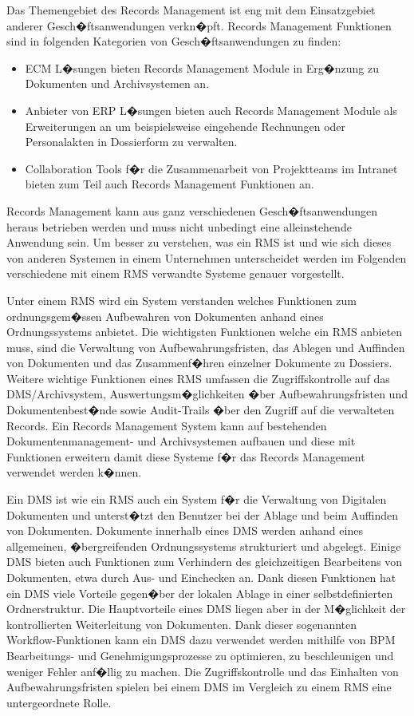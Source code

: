 \documentclass[a4paper,twoside,10pt]{report}
\begin{document}
Das Themengebiet des Records Management ist eng mit dem Einsatzgebiet anderer Gesch�ftsanwendungen verkn�pft. Records Management Funktionen sind in folgenden Kategorien von Gesch�ftsanwendungen zu finden: 

\begin{itemize}
	\item \ac{ECM} L�sungen bieten Records Management Module in Erg�nzung zu Dokumenten und Archivsystemen an. 
	\item Anbieter von \ac{ERP} L�sungen bieten auch Records Management Module als Erweiterungen an um beispielsweise eingehende Rechnungen oder Personalakten in Dossierform zu verwalten.
	\item Collaboration Tools f�r die Zusammenarbeit von Projektteams im Intranet bieten zum Teil auch Records Management Funktionen an.
\end{itemize} 
\cite{krm}

Records Management kann aus ganz verschiedenen Gesch�ftsanwendungen heraus betrieben werden und muss nicht unbedingt eine alleinstehende Anwendung sein. Um besser zu verstehen, was ein \acf{RMS} ist und wie sich dieses von anderen Systemen in einem Unternehmen unterscheidet werden im Folgenden verschiedene mit einem \ac{RMS} verwandte Systeme genauer vorgestellt. 

Unter einem \ac{RMS} wird ein System verstanden welches Funktionen zum ordnungsgem�ssen Aufbewahren von Dokumenten anhand eines Ordnungssystems anbietet. Die wichtigsten Funktionen welche ein \ac{RMS} anbieten muss, sind die Verwaltung von Aufbewahrungsfristen, das Ablegen und Auffinden von Dokumenten und das Zusammenf�hren einzelner Dokumente zu Dossiers. Weitere wichtige Funktionen eines \ac{RMS} umfassen die Zugriffskontrolle auf das DMS/Archivsystem, Auswertungsm�glichkeiten �ber Aufbewahrungsfristen und Dokumentenbest�nde sowie Audit-Trails �ber den Zugriff auf die verwalteten Records. Ein Records Management System kann auf bestehenden Dokumentenmanagement- und Archivsystemen aufbauen und diese mit Funktionen erweitern damit diese Systeme f�r das Records Management verwendet werden k�nnen. \cite{krm} 

Ein \ac{DMS} ist wie ein \ac{RMS} auch ein System f�r die Verwaltung von Digitalen Dokumenten und unterst�tzt den Benutzer bei der Ablage und beim Auffinden von Dokumenten. Dokumente innerhalb eines \ac{DMS} werden anhand eines allgemeinen, �bergreifenden Ordnungssystems strukturiert und abgelegt. Einige \ac{DMS} bieten auch Funktionen zum Verhindern des gleichzeitigen Bearbeitens von Dokumenten, etwa durch Aus- und Einchecken an. Dank diesen Funktionen hat ein \ac{DMS} viele Vorteile gegen�ber der lokalen Ablage in einer selbstdefinierten Ordnerstruktur. Die Hauptvorteile eines \ac{DMS} liegen aber in der M�glichkeit der kontrollierten Weiterleitung von Dokumenten. Dank dieser sogenannten Workflow-Funktionen kann ein \ac{DMS} dazu verwendet werden mithilfe von \ac{BPM} Bearbeitungs- und Genehmigungsprozesse zu optimieren, zu beschleunigen und weniger Fehler anf�llig zu machen. Die Zugriffskontrolle und das Einhalten von Aufbewahrungsfristen spielen bei einem \ac{DMS} im Vergleich zu einem \ac{RMS} eine untergeordnete Rolle. 
\cite{krm}
\end{document}
